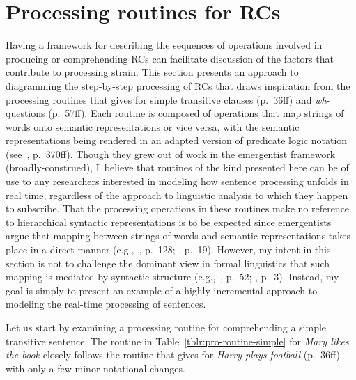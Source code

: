 \section{Processing routines for RCs} \label{pro-routine}

Having a framework for describing the sequences of operations involved in producing or comprehending RCs can facilitate discussion of the factors that contribute to processing strain. This section presents an approach to diagramming the step-by-step processing of RCs that draws inspiration from the processing routines that \textcite{ogrady2022a} gives for simple transitive clauses (p.~36ff) and \textit{wh}-questions (p.~57ff). Each routine is composed of operations that map strings of words onto semantic representations or vice versa, with the semantic representations being rendered in an adapted version of predicate logic notation (see~\cite{saeed2016}, p.~370ff). Though they grew out of work in the emergentist framework (broadly-construed), I~believe that routines of the kind presented here can be of use to any researchers interested in modeling how sentence processing unfolds in real time, regardless of the approach to linguistic analysis to which they happen to subscribe. That the processing operations in these routines make no reference to hierarchical syntactic representations is to be expected since emergentists argue that mapping between strings of words and semantic representations takes place in a direct manner (e.g.,~\cite{macwhinney.etal1984}, p.~128; \cite{ogrady2022a}, p.~19). However, my intent in this section is not to challenge the dominant view in formal linguistics that such mapping is mediated by syntactic structure (e.g.,~\cite{chomsky1964}, p.~52; \cite{jackendoff2007}, p.~3). Instead, my goal is simply to present an example of a highly incremental approach to modeling the real-time processing of sentences.

Let us start by examining a processing routine for comprehending a simple transitive sentence. The routine in Table~\ref{tblr:pro-routine-simple} for \textit{Mary likes the book} closely follows the routine that \textcite{ogrady2022a} gives for \textit{Harry plays football} (p.~36ff) with only a few minor notational changes.


